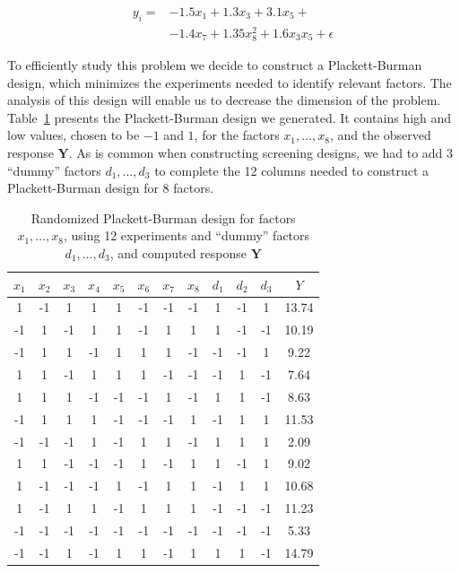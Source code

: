 \documentclass[conference]{IEEEtran}
\begin{document}
{\normalsize
\begin{align}
\label{eq:real_model}
y_i = & -1.5x_1 + 1.3x_3 + 3.1x_5 + \\
& -1.4x_7 + 1.35x_8^2 + 1.6x_3x_5 + \epsilon \nonumber
\end{align}
}

\vspace{-10pt}

To efficiently study this problem we decide to construct a Plackett-Burman
design, which minimizes the experiments needed to identify relevant factors. The
analysis of this design will enable us to decrease the dimension of the problem.
Table~\ref{tab:plackett} presents the Plackett-Burman design we generated.
It contains high and low values, chosen to be \(-1\) and \(1\), for the factors
\(x_1,\dots,x_8\), and the observed response \(\mathbf{Y}\). As is common when
constructing screening designs, we had to add 3 ``dummy'' factors
\(d_1,\dots,d_3\) to complete the 12 columns needed to construct a Plackett-Burman
design for 8 factors.

\begin{table}[ht]
\centering
\caption{Randomized Plackett-Burman design for factors $x_1, \dots, x_8$, using 12 experiments and ``dummy'' factors $d_1, \dots, d_3$, and computed response $\mathbf{Y}$}
\label{tab:plackett}
\begingroup\scriptsize
\begin{tabular}{cccccccccccc}
  \toprule
$x_1$ & $x_2$ & $x_3$ & $x_4$ & $x_5$ & $x_6$ & $x_7$ & $x_8$ & $d_1$ & $d_2$ & $d_3$ & $Y$ \\
  \midrule
1 & -1 & 1 & 1 & 1 & -1 & -1 & -1 & 1 & -1 & 1 & 13.74 \\
  -1 & 1 & -1 & 1 & 1 & -1 & 1 & 1 & 1 & -1 & -1 & 10.19 \\
  -1 & 1 & 1 & -1 & 1 & 1 & 1 & -1 & -1 & -1 & 1 & 9.22 \\
  1 & 1 & -1 & 1 & 1 & 1 & -1 & -1 & -1 & 1 & -1 & 7.64 \\
  1 & 1 & 1 & -1 & -1 & -1 & 1 & -1 & 1 & 1 & -1 & 8.63 \\
  -1 & 1 & 1 & 1 & -1 & -1 & -1 & 1 & -1 & 1 & 1 & 11.53 \\
  -1 & -1 & -1 & 1 & -1 & 1 & 1 & -1 & 1 & 1 & 1 & 2.09 \\
  1 & 1 & -1 & -1 & -1 & 1 & -1 & 1 & 1 & -1 & 1 & 9.02 \\
  1 & -1 & -1 & -1 & 1 & -1 & 1 & 1 & -1 & 1 & 1 & 10.68 \\
  1 & -1 & 1 & 1 & -1 & 1 & 1 & 1 & -1 & -1 & -1 & 11.23 \\
  -1 & -1 & -1 & -1 & -1 & -1 & -1 & -1 & -1 & -1 & -1 & 5.33 \\
  -1 & -1 & 1 & -1 & 1 & 1 & -1 & 1 & 1 & 1 & -1 & 14.79 \\
   \bottomrule
\end{tabular}
\endgroup
\end{table}
\end{document}

